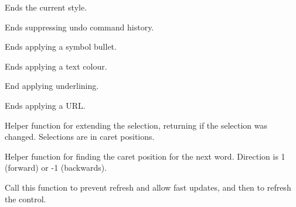Ends the current style.

\label{wxrichtextctrlendsuppressundo}


Ends suppressing undo command history.

\label{wxrichtextctrlendsymbolbullet}


Ends applying a symbol bullet.

\label{wxrichtextctrlendtextcolour}


Ends applying a text colour.

\label{wxrichtextctrlendunderline}


End applying underlining.

\label{wxrichtextctrlendurl}


Ends applying a URL.

\label{wxrichtextctrlextendselection}


Helper function for extending the selection, returning \true if the selection was
changed. Selections are in caret positions.

\label{wxrichtextctrlfindnextwordposition}


Helper function for finding the caret position for the next word. Direction
is 1 (forward) or -1 (backwards).

\label{wxrichtextctrlfreeze}


Call this function to prevent refresh and allow fast updates, and then  to
refresh the control.

\label{wxrichtextctrlgetbasicstyle}

